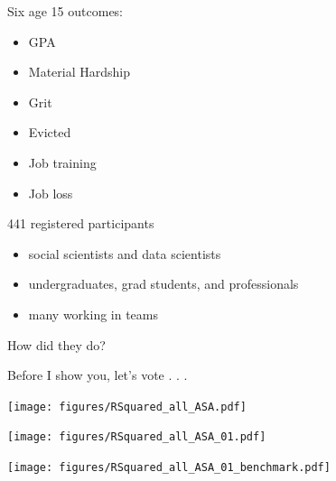 \documentclass{beamer}
\begin{document}
\begin{frame}

Six age 15 outcomes:
\begin{itemize}
\item GPA
\item Material Hardship
\item Grit
\item Evicted
\item Job training
\item Job loss
\end{itemize}

\end{frame}
\begin{frame}

441 registered participants
\begin{itemize}
\item social scientists and data scientists
\item undergraduates, grad students, and professionals
\item many working in teams
\end{itemize}

\end{frame}
\begin{frame}

\begin{center}
How did they do?
\end{center}

\end{frame}
\begin{frame}

Before I show you, let's vote . . .

\end{frame}
\begin{frame}

\centering
\texttt{[image: figures/RSquared\_all\_ASA.pdf]}

\end{frame}
\begin{frame}

\centering
\texttt{[image: figures/RSquared\_all\_ASA\_01.pdf]}

\end{frame}
\begin{frame}

\centering
\texttt{[image: figures/RSquared\_all\_ASA\_01\_benchmark.pdf]}

\end{frame}
\end{document}
